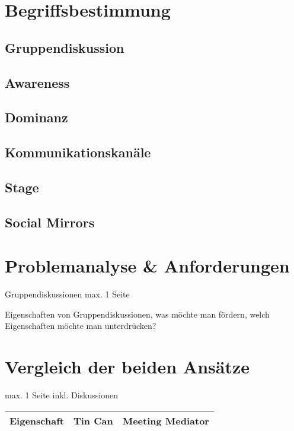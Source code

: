 \documentclass{seminarvorlage}
\begin{document}
\section{Begriffsbestimmung}
\subsection{Gruppendiskussion}
\subsection{Awareness}
\subsection{Dominanz}
\subsection{Kommunikationskanäle}
\subsection{Stage}
\subsection{Social Mirrors}

\section{Problemanalyse \& Anforderungen}
Gruppendiskussionen
max. 1 Seite

 Eigenschaften von Gruppendiskussionen, was möchte man fördern, welch Eigenschaften möchte man unterdrücken?





\section{Vergleich der beiden Ansätze}
max. 1 Seite
inkl. Diskussionen

\begin{tabular}{ l | l | l }
  Eigenschaft & Tin Can & Meeting Mediator \\
  \hline
\end{tabular}

\end{document}
